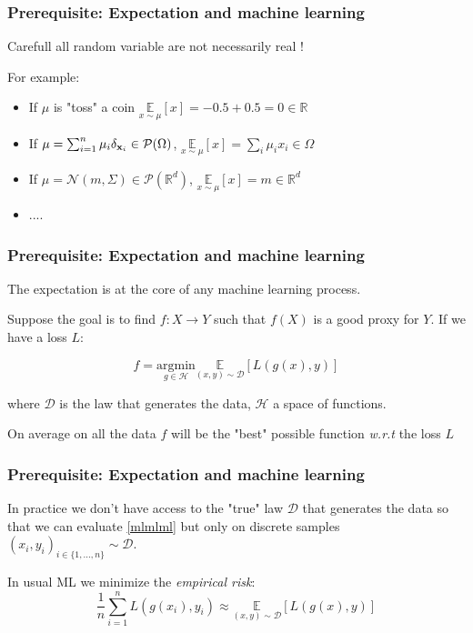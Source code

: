 \documentclass[french,9pt]{beamer}
\newcommand{\x}{{\bf x}}
\begin{document}

\begin{frame}
\frametitle{Prerequisite: Expectation and machine learning}
Carefull all random variable are not necessarily real ! 

For example:

\begin{itemize}
    \item If $\mu$ is "toss" a coin $\underset{x \sim \mu}{\mathbb{E}}[x]=-0.5+0.5=0 \in \mathbb{R}$
    \item If $\mu=\sum_{i=1}^n \mu_i\delta_{\x_i} \in \mathcal{P}(\Omega)$, $\underset{x \sim \mu}{\mathbb{E}}[x]=\sum_{i} \mu_{i} x_{i} \in \Omega$
    \item If $\mu=\mathcal{N}(m,\Sigma) \in \mathcal{P}(\mathbb{R}^{d})$, $\underset{x \sim \mu}{\mathbb{E}}[x]=m \in \mathbb{R}^{d}$
    \item ....
\end{itemize}{}

\end{frame}



\begin{frame}
\frametitle{Prerequisite: Expectation and machine learning}
The expectation is at the core of any machine learning process.

Suppose the goal is to find $f: X \rightarrow Y$ such that $f(X)$ is a good proxy for $Y$. If we have a loss $L$:

\begin{equation}
\label{mlmlml}
    f= \underset{g \in \mathcal{H}}{\text{argmin}}\underset{(x,y) \sim \mathcal{D}}{\mathbb{E}}[L(g(x),y)]
\end{equation}{}

where $\mathcal{D}$ is the law that generates the data, $\mathcal{H}$ a space of functions. 

\pause

On average on all the data $f$ will be the "best" possible function \textit{w.r.t} the loss $L$

\end{frame}


\begin{frame}
\frametitle{Prerequisite: Expectation and machine learning}
In practice we don't have access to the "true" law $\mathcal{D}$ that generates the data so that we can evaluate \eqref{mlmlml} but only on discrete samples $(x_{i},y_{i})_{i \in \{1,...,n\}} \sim \mathcal{D}$.
\pause

In usual ML we minimize the \emph{empirical risk}: $$\frac{1}{n} \sum_{i=1}^{n} L(g(x_{i}),y_{i})\approx \underset{(x,y) \sim \mathcal{D}}{\mathbb{E}}[L(g(x),y)]$$ 

\end{frame}
\end{document}
